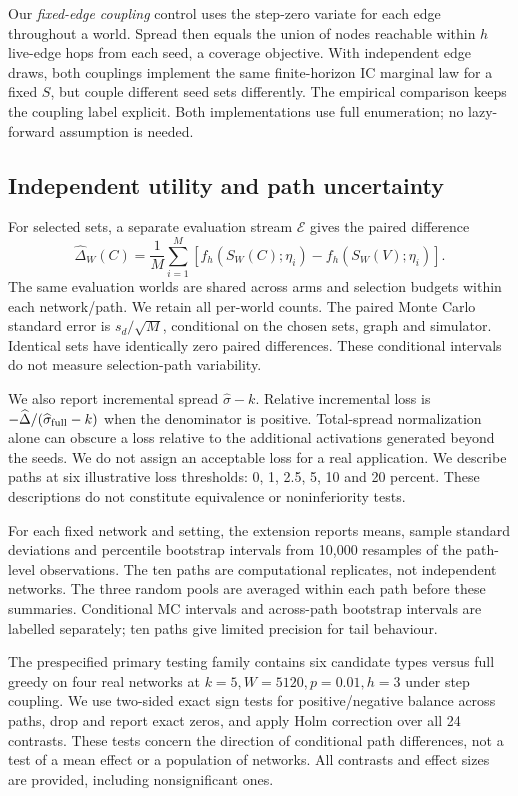 \documentclass[smallextended]{svjour3}
\begin{document}
Our \emph{fixed-edge coupling} control uses the step-zero variate for each edge throughout a world. Spread then equals the union of nodes reachable within $h$ live-edge hops from each seed, a coverage objective. With independent edge draws, both couplings implement the same finite-horizon IC marginal law for a fixed $S$, but couple different seed sets differently. The empirical comparison keeps the coupling label explicit. Both implementations use full enumeration; no lazy-forward assumption is needed.

\subsection{Independent utility and path uncertainty}
For selected sets, a separate evaluation stream $\mathcal E$ gives the paired difference
\begin{equation}
\widehat\Delta_W(C)=\frac{1}{M}\sum_{i=1}^{M}
\left[f_h(S_W(C);\eta_i)-f_h(S_W(V);\eta_i)\right].
\end{equation}
The same evaluation worlds are shared across arms and selection budgets within each network/path. We retain all per-world counts. The paired Monte Carlo standard error is $s_d/\sqrt M$, conditional on the chosen sets, graph and simulator. Identical sets have identically zero paired differences. These conditional intervals do not measure selection-path variability.

We also report incremental spread $\widehat\sigma-k$. Relative incremental loss is $-\widehat\Delta/(\widehat\sigma_{\rm full}-k)$ when the denominator is positive. Total-spread normalization alone can obscure a loss relative to the additional activations generated beyond the seeds. We do not assign an acceptable loss for a real application. We describe paths at six illustrative loss thresholds: 0, 1, 2.5, 5, 10 and 20 percent. These descriptions do not constitute equivalence or noninferiority tests.

For each fixed network and setting, the extension reports means, sample standard deviations and percentile bootstrap intervals from 10,000 resamples of the path-level observations. The ten paths are computational replicates, not independent networks. The three random pools are averaged within each path before these summaries. Conditional MC intervals and across-path bootstrap intervals are labelled separately; ten paths give limited precision for tail behaviour.

The prespecified primary testing family contains six candidate types versus full greedy on four real networks at $k=5,W=5120,p=0.01,h=3$ under step coupling. We use two-sided exact sign tests for positive/negative balance across paths, drop and report exact zeros, and apply Holm correction over all 24 contrasts. These tests concern the direction of conditional path differences, not a test of a mean effect or a population of networks. All contrasts and effect sizes are provided, including nonsignificant ones.
\end{document}
